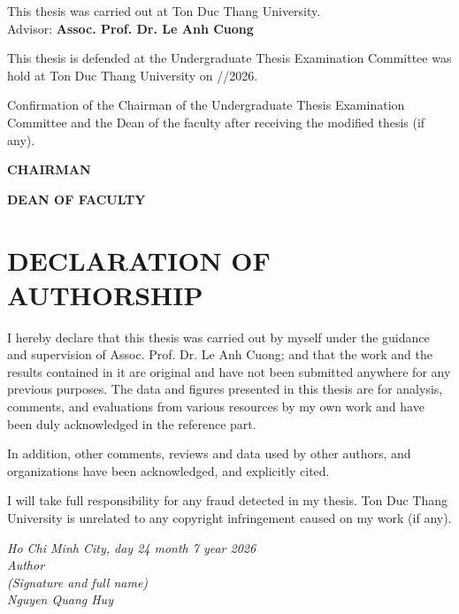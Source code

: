 
\noindent
This thesis was carried out at Ton Duc Thang University.\\
Advisor: \textbf{Assoc. Prof. Dr. Le Anh Cuong}\\

\makebox[7.5cm]{\dotfill}

\vspace*{1cm}

This thesis is defended at the Undergraduate Thesis Examination Committee was hold at Ton Duc Thang University on \dotfill/\dotfill/2026.

\vspace*{1cm}

\noindent
Confirmation of the Chairman of the Undergraduate Thesis Examination Committee and the Dean of the faculty after receiving the modified thesis (if any).

\vspace*{2cm}

\noindent
\begin{minipage}[t]{6.5cm}
	\centering
	\textbf{CHAIRMAN}\\
	\vspace*{2cm}
	\dotfill
\end{minipage}
\hfill
\begin{minipage}[t]{6.5cm}
	\centering
	\textbf{DEAN OF FACULTY}\\
	\vspace*{2cm}
	\dotfill
\end{minipage}

\newpage

\chapter*{DECLARATION OF AUTHORSHIP}

\qquad I hereby declare that this thesis was carried out by myself under the guidance and supervision of Assoc. Prof. Dr. Le Anh Cuong; and that the work and the results contained in it are original and have not been submitted anywhere for any previous purposes. The data and figures presented in this thesis are for analysis, comments, and evaluations from various resources by my own work and have been duly acknowledged in the reference part.

\qquad In addition, other comments, reviews and data used by other authors, and organizations have been acknowledged, and explicitly cited.

\qquad I will take full responsibility for any fraud detected in my thesis. Ton Duc Thang University is unrelated to any copyright infringement caused on my work (if any).

\vspace*{1cm}
\begin{flushright}
	\begin{minipage}{8.75cm}
		\centering\itshape
		Ho Chi Minh City, day 24 month 7 year 2026\\
		Author\\
		(Signature and full name)\\


		\vspace*{2cm}
		Nguyen Quang Huy
	\end{minipage}
\end{flushright}
\newpage